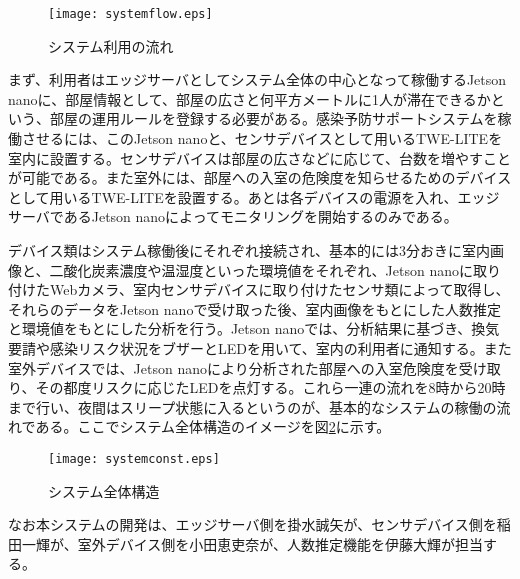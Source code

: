 \begin{figure}[H]
	\centering
	\texttt{[image: systemflow.eps]}
	\caption{システム利用の流れ}
	\label{systemflow}
\end{figure}

まず、利用者はエッジサーバとしてシステム全体の中心となって稼働するJetson nanoに、部屋情報として、部屋の広さと何平方メートルに1人が滞在できるかという、部屋の運用ルールを登録する必要がある。感染予防サポートシステムを稼働させるには、このJetson nanoと、センサデバイスとして用いるTWE-LITEを室内に設置する。センサデバイスは部屋の広さなどに応じて、台数を増やすことが可能である。また室外には、部屋への入室の危険度を知らせるためのデバイスとして用いるTWE-LITEを設置する。あとは各デバイスの電源を入れ、エッジサーバであるJetson nanoによってモニタリングを開始するのみである。

デバイス類はシステム稼働後にそれぞれ接続され、基本的には3分おきに室内画像と、二酸化炭素濃度や温湿度といった環境値をそれぞれ、Jetson nanoに取り付けたWebカメラ、室内センサデバイスに取り付けたセンサ類によって取得し、それらのデータをJetson nanoで受け取った後、室内画像をもとにした人数推定と環境値をもとにした分析を行う。Jetson nanoでは、分析結果に基づき、換気要請や感染リスク状況をブザーとLEDを用いて、室内の利用者に通知する。また室外デバイスでは、Jetson nanoにより分析された部屋への入室危険度を受け取り、その都度リスクに応じたLEDを点灯する。これら一連の流れを8時から20時まで行い、夜間はスリープ状態に入るというのが、基本的なシステムの稼働の流れである。ここでシステム全体構造のイメージを図\ref{systemconst}に示す。

\begin{figure}[H]
	\centering
	\texttt{[image: systemconst.eps]}
	\caption{システム全体構造}
	\label{systemconst}
\end{figure}

なお本システムの開発は、エッジサーバ側を掛水誠矢が、センサデバイス側を稲田一輝が、室外デバイス側を小田恵吏奈が、人数推定機能を伊藤大輝が担当する。



